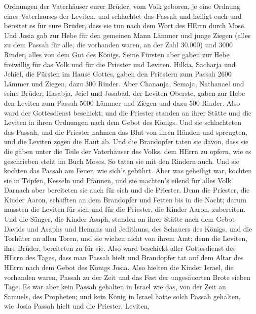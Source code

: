 Ordnungen der Vaterhäuser eurer Brüder, vom Volk geboren, je eine
Ordnung eines Vaterhauses der Leviten,  und schlachtet das
Passah und heiligt euch und bereitet es für eure Brüder, dass sie tun
nach dem Wort des HErrn durch Mose.  Und Josia gab zur Hebe
für den gemeinen Mann Lämmer und junge Ziegen (alles zu dem Passah für
alle, die vorhanden waren, an der Zahl 30.000) und 3000 Rinder, alles
von dem Gut des Königs.  Seine Fürsten aber gaben zur Hebe
freiwillig für das Volk und für die Priester und Leviten. Hilkia,
Sacharja und Jehiel, die Fürsten im Hause Gottes, gaben den Priestern
zum Passah 2600 Lämmer und Ziegen, dazu 300 Rinder.  Aber
Chananja, Semaja, Nathanael und seine Brüder, Hasabja, Jeiel und
Josabad, der Leviten Oberste, gaben zur Hebe den Leviten zum Passah 5000
Lämmer und Ziegen und dazu 500 Rinder.  Also ward der
Gottesdienst beschickt; und die Priester standen an ihrer Stätte und die
Leviten in ihren Ordnungen nach dem Gebot des Königs.  Und
sie schlachteten das Passah, und die Priester nahmen das Blut von ihren
Händen und sprengten, und die Leviten zogen die Haut ab. 
Und die Brandopfer taten sie davon, dass sie die gäben unter die Teile
der Vaterhäuser des Volks, dem HErrn zu opfern, wie es geschrieben steht
im Buch Moses. So taten sie mit den Rindern auch.  Und sie
kochten das Passah am Feuer, wie sich's gebührt. Aber was geheiligt war,
kochten sie in Töpfen, Kesseln und Pfannen, und sie machten's eilend für
alles Volk.  Darnach aber bereiteten sie auch für sich und
die Priester. Denn die Priester, die Kinder Aaron, schafften an dem
Brandopfer und Fetten bis in die Nacht; darum mussten die Leviten für
sich und für die Priester, die Kinder Aaron, zubereiten. 
Und die Sänger, die Kinder Asaph, standen an ihrer Stätte nach dem Gebot
Davids und Asaphs und Hemans und Jedithuns, des Schauers des Königs, und
die Torhüter an allen Toren, und sie wichen nicht von ihrem Amt; denn
die Leviten, ihre Brüder, bereiteten zu für sie.  Also ward
beschickt aller Gottesdienst des HErrn des Tages, dass man Passah hielt
und Brandopfer tat auf dem Altar des HErrn nach dem Gebot des Königs
Josia.  Also hielten die Kinder Israel, die vorhanden
waren, Passah zu der Zeit und das Fest der ungesäuerten Brote sieben
Tage.  Es war aber kein Passah gehalten in Israel wie das,
von der Zeit an Samuels, des Propheten; und kein König in Israel hatte
solch Passah gehalten, wie Josia Passah hielt und die Priester, Leviten,
